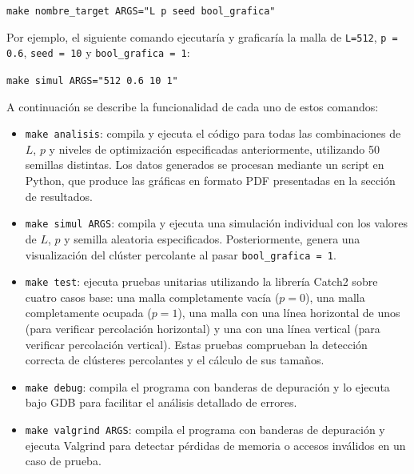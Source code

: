 \documentclass[%
 reprint,
 amsmath,amssymb,
 aps,
]{revtex4-2}
\begin{document}
\begin{center}
    \texttt{make nombre\_target ARGS="L p seed bool\_grafica"}
\end{center}


Por ejemplo, el siguiente comando ejecutaría y graficaría la malla de \texttt{L=512}, \texttt{p = 0.6}, \texttt{seed = 10} y \texttt{bool\_grafica = 1}:

\begin{center}
    \texttt{make simul ARGS="512 0.6 10 1"}
\end{center}

A continuación se describe la funcionalidad de cada uno de estos comandos:

\begin{itemize}
    \item \texttt{make analisis}: compila y ejecuta el código para todas las combinaciones de \( L \), \( p \) y niveles de optimización especificadas anteriormente, utilizando 50 semillas distintas. Los datos generados se procesan mediante un script en Python, que produce las gráficas en formato PDF presentadas en la sección de resultados.

    \item \texttt{make simul ARGS}: compila y ejecuta una simulación individual con los valores de \( L \), \( p \) y semilla aleatoria especificados. Posteriormente, genera una visualización del clúster percolante al pasar \texttt{bool\_grafica = 1}.
    
    \item \texttt{make test}: ejecuta pruebas unitarias utilizando la librería Catch2\cite{catch2} sobre cuatro casos base: una malla completamente vacía (\( p = 0 \)), una malla completamente ocupada (\( p = 1 \)), una malla con una línea horizontal de unos (para verificar percolación horizontal) y una con una línea vertical (para verificar percolación vertical). Estas pruebas comprueban la detección correcta de clústeres percolantes y el cálculo de sus tamaños.
    
    \item \texttt{make debug}: compila el programa con banderas de depuración y lo ejecuta bajo GDB\cite{GDB} para facilitar el análisis detallado de errores.
    
    \item \texttt{make valgrind ARGS}: compila el programa con banderas de depuración y ejecuta Valgrind\cite{Valgrind} para detectar pérdidas de memoria o accesos inválidos en un caso de prueba.
    

\end{itemize}
\end{document}
